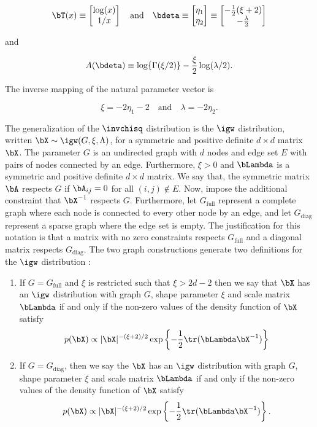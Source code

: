 \documentclass[12pt]{article}
\theoremstyle{plain}
\theoremstyle{definition}
\theoremstyle{remark}
\begin{document}
\[
	\bT (x) \equiv \begin{bmatrix}
		\log (x) \\
		1/x
	\end{bmatrix} \quad
	\text{and} \quad
	\bdeta \equiv \begin{bmatrix}
		\eta_1 \\
		\eta_2
	\end{bmatrix} \equiv \begin{bmatrix}
		-\frac12 (\xi + 2) \\
		-\frac{\lambda}{2}
	\end{bmatrix}
\]

\noindent and

\[
	A(\bdeta) \equiv \log \{ \Gamma (\xi/2) \} - \frac{\xi}{2} \log (\lambda/2).
\]

\noindent The inverse mapping of the natural parameter vector is \cite[equation~8]{maestrini20}

\[
	\xi = -2 \eta_1 - 2 \quad
	\text{and} \quad
	\lambda = -2 \eta_2.
\]

The generalization of the $\invchisq$ distribution is the $\igw$ distribution, written $\bX \sim \igw (G, \xi, \Lambda)$,
for a symmetric and positive definite $d \times d$ matrix $\bX$.
The parameter $G$ is an undirected graph with $d$ nodes and edge
set $E$ with pairs of nodes connected by an edge. Furthermore, $\xi > 0$ and
$\bLambda$ is a symmetric and positive definite $d \times d$ matrix.
We say that, the symmetric matrix $\bA$ respects $G$ if $\bA_{ij} = 0$
for all $( i, j ) \notin E$. Now, impose the additional constraint that  $\bX^{-1}$ respects $G$. Furthermore, let $G_{\text{full}}$ represent a
complete graph where each node is connected
to every other node by an edge, and let $G_{\text{diag}}$ represent a sparse graph where the edge set is empty.
The justification for this notation is that a matrix with no zero constraints respects $G_{\text{full}}$ and a diagonal
matrix respects $G_{\text{diag}}$.
The two graph constructions generate two definitions for the $\igw$ distribution \cite[Definition~3]{maestrini20}:

\begin{enumerate}[label={(\alph*)}]
	\item If $G = G_{\text{full}}$ and $\xi$ is restricted such that $\xi > 2d - 2$ then we say that $\bX$ has an $\igw$
	distribution with graph $G$, shape parameter $\xi$ and scale matrix $\bLambda$ if and only if the non-zero
	values of the density function of $\bX$ satisfy
		\[
			p (\bX) \propto |\bX|^{-(\xi + 2)/2} \exp \left\{ -\frac12 \tr (\bLambda \bX^{-1}) \right\}
		\]
	\item If $G = G_{\text{diag}}$, then we say the $\bX$ has an $\igw$
	distribution with graph $G$, shape parameter $\xi$ and scale matrix $\bLambda$ if and only if the non-zero
	values of the density function of $\bX$ satisfy
		\[
			p (\bX) \propto |\bX|^{-(\xi + 2)/2} \exp \left\{ -\frac12 \tr (\bLambda \bX^{-1}) \right\}.
		\]
\end{enumerate}
\end{document}
